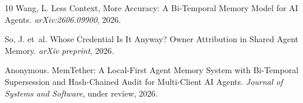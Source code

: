 \documentclass[10pt,twocolumn]{article}
\begin{document}
\begin{thebibliography}{10}
Wang, L.
\newblock Less Context, More Accuracy: A Bi-Temporal Memory Model for AI Agents.
\newblock \emph{arXiv:2606.09900}, 2026.

So, J. et~al.
\newblock Whose Credential Is It Anyway? Owner Attribution in Shared Agent Memory.
\newblock \emph{arXiv preprint}, 2026.


Anonymous.
\newblock MemTether: A Local-First Agent Memory System with Bi-Temporal Supersession and Hash-Chained Audit for Multi-Client AI Agents.
\newblock \emph{Journal of Systems and Software}, under review, 2026.

\end{thebibliography}
\end{document}
